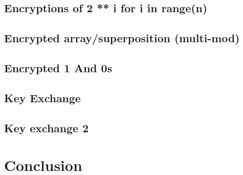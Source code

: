\documentclass[preprint]{iacrtrans}
\begin{document}
\subsection{Encryptions of 2 ** i for i in range(n)}
\subsection{Encrypted array/superposition (multi-mod)}
\subsection{Encrypted 1 And 0s} %
\subsection{Key Exchange} %
\subsection{Key exchange 2} %


\section{Conclusion}
\end{document}
